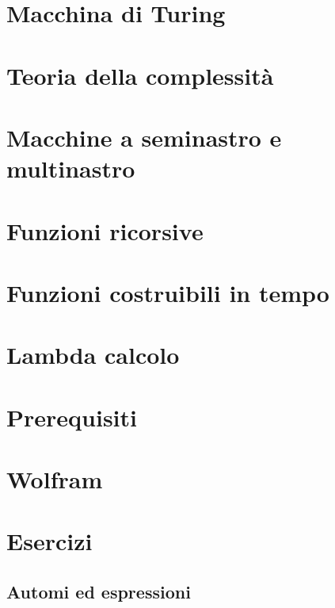 \documentclass[12pt]{article}
\begin{document}
\newpage

\section{Macchina di Turing}


\newpage

\section{Teoria della complessità}


\newpage

\section{Macchine a seminastro e multinastro}


\newpage

\section{Funzioni ricorsive}


\newpage

\section{Funzioni costruibili in tempo}


\newpage

\section{Lambda calcolo}



\newpage
\section{Prerequisiti}


\newpage
\section{Wolfram}


\newpage
\section{Esercizi}
\subsection{Automi ed espressioni}

\end{document}
